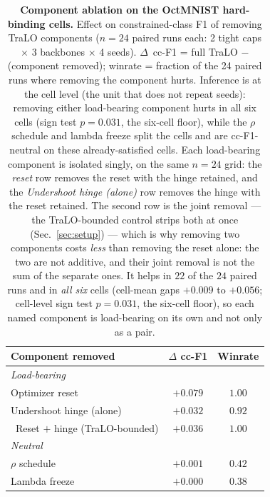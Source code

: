 \begin{table}[t]\centering\small
\caption{
{\textbf{Component ablation on the OctMNIST hard-binding cells.} Effect on constrained-class F1 of removing TraLO components}
($n{=}24$ paired runs each: 2 tight caps $\times$ 3 backbones $\times$ 4 seeds). $\Delta$~cc-F1 = full TraLO $-$ (component removed); winrate = fraction of the 24 paired runs where removing the component hurts. Inference is at the cell level (the unit that does not repeat seeds): removing either load-bearing component hurts in all six cells (sign test $p{=}0.031$, the six-cell floor), while the $\rho$ schedule and lambda freeze split the cells and are cc-F1-neutral on these already-satisfied cells. 
{Each load-bearing component is isolated singly, on the same $n{=}24$ grid:
the \emph{reset} row removes the reset with the hinge retained, and the
\emph{Undershoot hinge (alone)} row removes the hinge with the reset retained.
The second row is the joint removal --- the TraLO-bounded control strips both at once
(Sec.~\ref{sec:setup}) --- which is why removing two components costs \emph{less} than
removing the reset alone: the two are not additive, and their joint removal is not the
sum of the separate ones. It helps in $22$ of the $24$
paired runs and in \emph{all six} cells (cell-mean gaps $+0.009$ to $+0.056$; cell-level
sign test $p{=}0.031$, the six-cell floor), so each named component is load-bearing on its
own and not only as a pair.}}
\label{tab:ablation_complete}
\begin{tabular}{l c c}
\toprule
Component removed & $\Delta$ cc-F1 & Winrate \\
\midrule
\multicolumn{3}{l}{\emph{Load-bearing}} \\
Optimizer reset   & $+0.079$ & $1.00$ \\
{Undershoot hinge (alone)} & {$+0.032$} & {$0.92$} \\
\ {Reset $+$ hinge (TraLO-bounded)}  & $+0.036$ & $1.00$ \\
\midrule
\multicolumn{3}{l}{\emph{Neutral}} \\
$\rho$ schedule   & $+0.001$ & $0.42$ \\
Lambda freeze     & $+0.000$ & $0.38$ \\
\bottomrule
\end{tabular}
\end{table}
